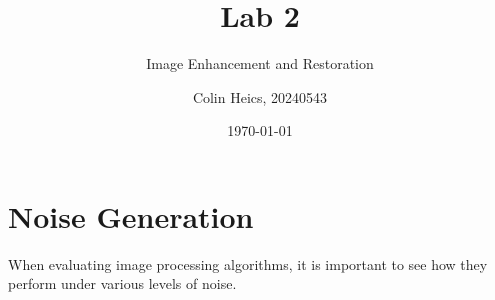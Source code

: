 \documentclass[article, 1.5space, letterpaper, 12pt, oneside, header, footer]{SydeClass}
\title{Lab 2}
\subtitle{Image Enhancement and Restoration}
\author{Colin Heics, 20240543}
\date{\today}
\begin{document}



\section{Noise Generation}

When evaluating image processing algorithms, it is important to see how they perform under various levels of noise.


\begin{figure}[ht]
\centering
\end{figure}
\end{document}
